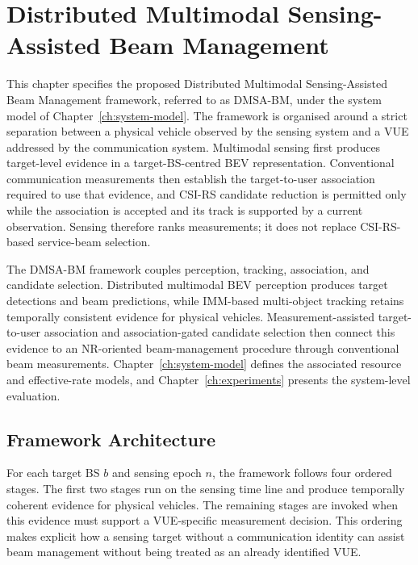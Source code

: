 \chapter{Distributed Multimodal Sensing-Assisted Beam Management}
\label{ch:methodology}

This chapter specifies the proposed Distributed Multimodal Sensing-Assisted
Beam Management framework, referred to as DMSA-BM, under the system model of
Chapter~\ref{ch:system-model}.  The framework is
organised around a strict separation between a physical vehicle observed by the
sensing system and a VUE addressed by the communication system.  Multimodal
sensing first produces target-level evidence in a target-BS-centred BEV
representation.  Conventional communication measurements then establish the
target-to-user association required to use that evidence, and CSI-RS candidate
reduction is permitted only while the association is accepted and its track is
supported by a current observation.  Sensing therefore ranks measurements; it
does not replace CSI-RS-based service-beam selection.

The DMSA-BM framework couples perception, tracking, association, and candidate
selection.  Distributed multimodal BEV perception produces target detections
and beam predictions, while IMM-based multi-object tracking retains temporally
consistent evidence for physical vehicles.  Measurement-assisted target-to-user
association and association-gated candidate selection then connect this evidence
to an NR-oriented beam-management procedure through conventional beam
measurements.  Chapter~\ref{ch:system-model} defines the associated resource and
effective-rate models, and Chapter~\ref{ch:experiments} presents the system-level
evaluation.

\section{Framework Architecture}
\label{sec:method-framework}

For each target BS \(b\) and sensing epoch \(n\), the framework follows four
ordered stages.  The first two stages run on the sensing time line and produce
temporally coherent evidence for physical vehicles.  The remaining stages are
invoked when this evidence must support a VUE-specific measurement decision.
This ordering makes explicit how a sensing target without a communication
identity can assist beam management without being treated as an already
identified VUE.

